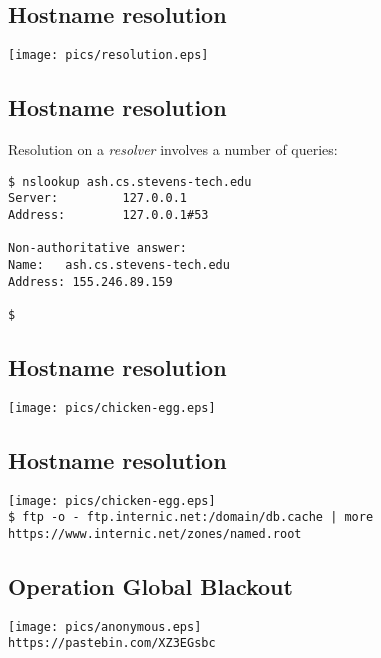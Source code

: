 \documentclass[xga]{xdvislides}
\begin{document}
\subsection{Hostname resolution}
\vspace*{\fill}
\begin{center}
	\texttt{[image: pics/resolution.eps]}
\end{center}
\vspace*{\fill}


\subsection{Hostname resolution}
Resolution on a {\em resolver} involves a number of queries:
\begin{verbatim}
$ nslookup ash.cs.stevens-tech.edu
Server:         127.0.0.1
Address:        127.0.0.1#53

Non-authoritative answer:
Name:   ash.cs.stevens-tech.edu
Address: 155.246.89.159

$
\end{verbatim}

\subsection{Hostname resolution}
\vspace*{\fill}
\begin{center}
	\texttt{[image: pics/chicken-egg.eps]} \\
	\vspace*{\fill}
\end{center}

\subsection{Hostname resolution}
\vspace*{\fill}
\begin{center}
	\texttt{[image: pics/chicken-egg.eps]} \\
	\addvspace{.2in}
	\verb+$ ftp -o - ftp.internic.net:/domain/db.cache | more+ \\
	\verb+https://www.internic.net/zones/named.root+
	\vspace*{\fill}
\end{center}

\subsection{Operation Global Blackout}
\vspace*{\fill}
\begin{center}
	\texttt{[image: pics/anonymous.eps]} \\
	\addvspace{.2in}
	\verb+https://pastebin.com/XZ3EGsbc+ \\
	\addvspace{.1in}
\end{center}
\vspace*{\fill}
\end{document}
